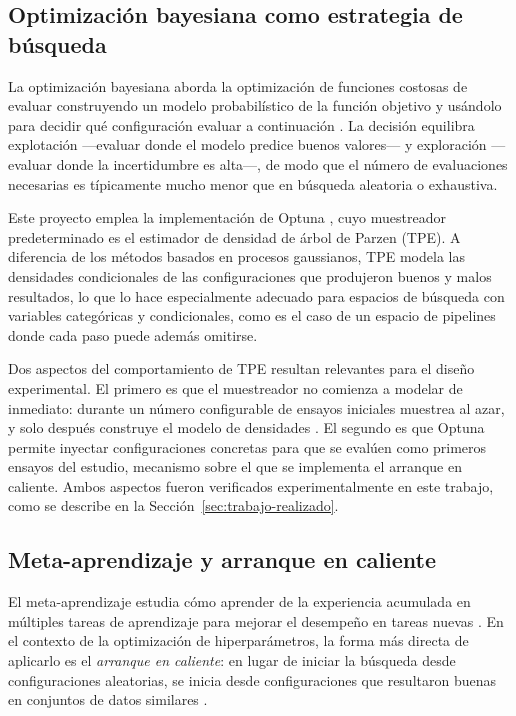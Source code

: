 \documentclass[12pt,letterpaper,oneside]{article}
\begin{document}
\subsection{Optimización bayesiana como estrategia de búsqueda}

La optimización bayesiana aborda la optimización de funciones costosas de evaluar
construyendo un modelo probabilístico de la función objetivo y usándolo para decidir qué
configuración evaluar a continuación \cite{snoek2012practical}. La decisión equilibra
explotación —evaluar donde el modelo predice buenos valores— y exploración —evaluar donde
la incertidumbre es alta—, de modo que el número de evaluaciones necesarias es
típicamente mucho menor que en búsqueda aleatoria o exhaustiva.

Este proyecto emplea la implementación de Optuna \cite{akiba2019optuna}, cuyo muestreador
predeterminado es el estimador de densidad de árbol de Parzen (TPE). A diferencia de los
métodos basados en procesos gaussianos, TPE modela las densidades condicionales de las
configuraciones que produjeron buenos y malos resultados, lo que lo hace especialmente
adecuado para espacios de búsqueda con variables categóricas y condicionales, como es el
caso de un espacio de pipelines donde cada paso puede además omitirse.

Dos aspectos del comportamiento de TPE resultan relevantes para el diseño experimental.
El primero es que el muestreador no comienza a modelar de inmediato: durante un número
configurable de ensayos iniciales muestrea al azar, y solo después construye el modelo de
densidades \cite{optuna-docs}. El segundo es que Optuna permite inyectar configuraciones
concretas para que se evalúen como primeros ensayos del estudio, mecanismo sobre el que se
implementa el arranque en caliente. Ambos aspectos fueron verificados experimentalmente en
este trabajo, como se describe en la Sección~\ref{sec:trabajo-realizado}.

\subsection{Meta-aprendizaje y arranque en caliente}

El meta-aprendizaje estudia cómo aprender de la experiencia acumulada en múltiples tareas
de aprendizaje para mejorar el desempeño en tareas nuevas
\cite{vanschoren2018metalearning, brazdil2009metalearning}. En el contexto de la
optimización de hiperparámetros, la forma más directa de aplicarlo es el
\textit{arranque en caliente}: en lugar de iniciar la búsqueda desde configuraciones
aleatorias, se inicia desde configuraciones que resultaron buenas en conjuntos de datos
similares \cite{feurer2015warmstart}.
\end{document}
